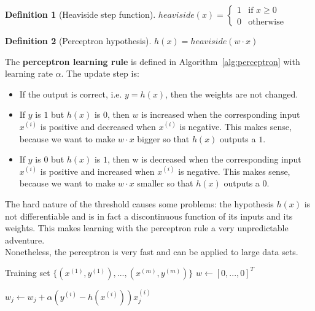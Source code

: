 \documentclass{report}
\newtheorem{definition}{Definition}[section]
\begin{document}
\begin{definition}[Heaviside step function]
$heaviside(x) = \left\{
\begin{array}{lll}
1  & \mbox{if } x \ge 0 \\
0  & \mbox{otherwise}
\end{array}
\right.$
\end{definition}

\begin{definition}[Perceptron hypothesis]
$h(x) = heaviside(w\cdot x)$
\end{definition}


The {\bf perceptron learning rule} is defined in Algorithm~\ref{alg:perceptron} with learning rate $\alpha$. The update step is:
\begin{itemize}
\item If the output is correct, i.e. $y = h(x)$, then the weights are not changed.
\item If $y$ is $1$ but $h(x)$ is $0$, then $w$ is increased when the corresponding input $x^{(i)}$ is positive and decreased when $x^{(i)}$ is negative. This makes sense, because we want to make $w\cdot x$ bigger so that $h(x)$ outputs a $1$.
\item If $y$ is 0 but $h(x)$ is $1$, then w is decreased when the corresponding input $x^{(i)}$ is positive and increased when $x^{(i)}$ is negative. This makes sense, because we want to make $w\cdot x$ smaller so that $h(x)$ outputs a $0$.
\end{itemize}

The hard nature of the threshold causes some problems: the hypothesis $h(x)$ is not differentiable and is in fact a discontinuous function of its inputs and its weights. This makes learning with the perceptron rule a very unpredictable adventure. \\
Nonetheless, the perceptron is very fast and can be applied to large data sets.

\begin{algorithm}[h!]
\caption{Perceptron learning rule}
\label{alg:perceptron}
\begin{algorithmic}
\State Training set $\{(x^{(1)},y^{(1)}),...,(x^{(m)},y^{(m)})\}$
\State $w \gets [0,...,0]^T$ 

\State $w_j \gets w_j + \alpha(y^{(i)} - h(x^{(i)})) x^{(i)}_j$ 
\EndFor

\end{algorithmic}
\end{algorithm}
\end{document}
